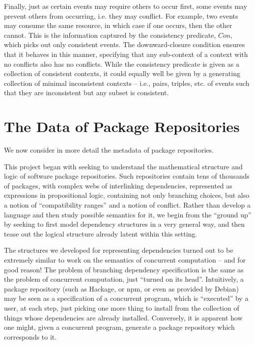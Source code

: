 \documentclass[hoptionsi,review,screen,format=sigconf]{acmart}
\theoremstyle{definition}
\begin{document}
Finally, just as certain events may require others to occur first, some events may prevent others from occurring, i.e. they may conflict. For example, two events may consume the same resource, in which case if one occurs, then the other cannot. This is the information captured by the consistency predicate, \(Con\), which picks out only consistent events. The downward-closure condition ensures that it behaves in this manner, specifying that any sub-context of a context with no conflicts also has no conflicts. While the consistency predicate is given as a collection of consistent contexts, it could equally well be given by a generating collection of minimal inconsistent contexts -- i.e., pairs, triples, etc. of events such that they are inconsistent but any subset is consistent.

\section{The Data of Package Repositories}

We now consider in more detail the metadata of package repositories. 

 



This project began with seeking to understand the mathematical structure and logic of software package repositories. Such repositories contain tens of thousands of packages, with complex webs of interlinking dependencies, represented as expressions in propositional logic, containing not only branching choices, but also a notion of ``compatibility ranges'' and a notion of conflict. Rather than develop a language and then study possible semantics for it, we begin from the ``ground up'' by seeking to first model dependency structures in a very general way, and then tease out the logical structure already latent within this setting.

The structures we developed for representing dependencies turned out to be extremely similar to work on the semantics of concurrent computation -- and for good reason! The problem of branching dependency specification is the same as the problem of concurrent computation, just ``turned on its head''. Intuitively, a package repository (such as Hackage, or npm, or even as provided by Debian) may be seen as a specification of a concurrent program, which is ``executed'' by a user, at each step, just picking one more thing to install from the collection of things whose dependencies are already installed. Conversely, it is apparent how one might, given a concurrent program, generate a package repository which corresponds to it.
\end{document}
